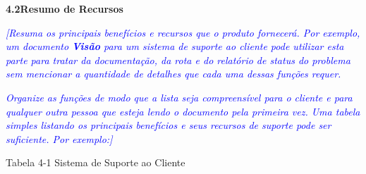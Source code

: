 \documentclass[a4paper]{article}
\begin{document}
\hypertarget{p8wle8ackrb6}{}\textbf{4.2Resumo de Recursos}

\textit{\textcolor{blue}{[Resuma os principais benef\'icios e recursos que o produto fornecer\'a. Por exemplo, um
documento }}\textbf{\textit{\textcolor{blue}{Vis\~ao}}}\textit{\textcolor{blue}{ para um sistema de suporte ao cliente
pode utilizar esta parte para tratar da documenta\c{c}\~ao, da rota e do relat\'orio de status do problema sem
mencionar a quantidade de detalhes que cada uma dessas fun\c{c}\~oes requer.}}

\textit{\textcolor{blue}{Organize as fun\c{c}\~oes de modo que a lista seja compreens\'ivel para o cliente e para
qualquer outra pessoa que esteja lendo o documento pela primeira vez. Uma tabela simples listando os principais
benef\'icios e seus recursos de suporte pode ser suficiente. Por exemplo:]}}

Tabela 4-1 Sistema de Suporte ao Cliente


\bigskip


\bigskip


\bigskip
\end{document}
